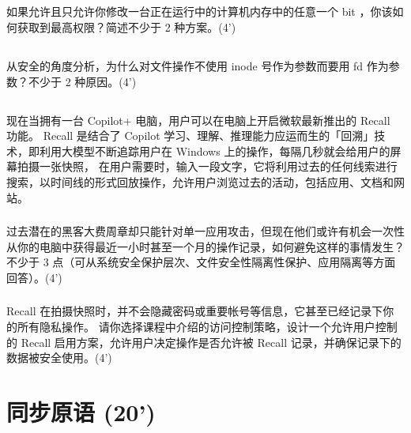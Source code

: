 \documentclass[a4paper,12pt]{article}
\begin{document}
\subsection{}

如果允许且只允许你修改一台正在运行中的计算机内存中的任意一个 bit ，你该如何获取到最高权限？简述不少于 2 种方案。(4')

\subsection{}

从安全的角度分析，为什么对文件操作不使用 inode 号作为参数而要用 fd 作为参数？不少于 2 种原因。(4')

\subsection{}

现在当拥有一台 Copilot+ 电脑，用户可以在电脑上开启微软最新推出的 Recall 功能。
Recall 是结合了 Copilot 学习、理解、推理能力应运而生的「回溯」技术，即利用大模型不断追踪用户在 Windows 上的操作，每隔几秒就会给用户的屏幕拍摄一张快照，
在用户需要时，输入一段文字，它将利用过去的任何线索进行搜索，以时间线的形式回放操作，允许用户浏览过去的活动，包括应用、文档和网站。

\subsubsection{}

过去潜在的黑客大费周章却只能针对单一应用攻击，但现在他们或许有机会一次性从你的电脑中获得最近一小时甚至一个月的操作记录，如何避免这样的事情发生？
不少于 3 点（可从系统安全保护层次、文件安全性隔离性保护、应用隔离等方面回答）。(4')

\subsubsection{}

Recall 在拍摄快照时，并不会隐藏密码或重要帐号等信息，它甚至已经记录下你的所有隐私操作。
请你选择课程中介绍的访问控制策略，设计一个允许用户控制的 Recall 启用方案，允许用户决定操作是否允许被 Recall 记录，并确保记录下的数据被安全使用。(4')

\section{同步原语 (20')}

\subsection{}
\end{document}
